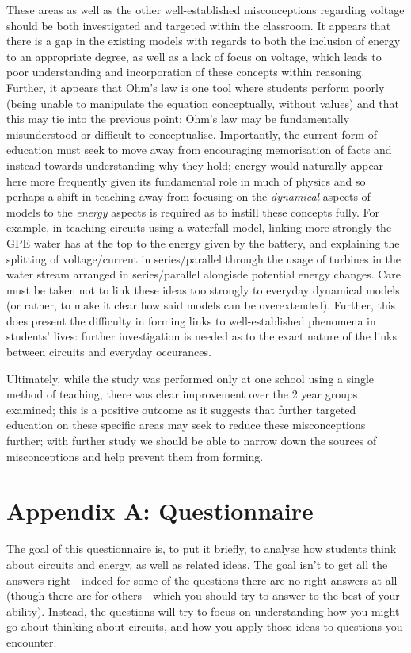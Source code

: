 \documentclass[a4paper,openany,nobib]{tufte-book}
\begin{document}
These areas as well as the other well-established misconceptions regarding voltage should be both investigated and targeted within the classroom. It appears that there is a gap in the existing models with regards to both the inclusion of energy to an appropriate degree, as well as a lack of focus on voltage, which leads to poor understanding and incorporation of these concepts within reasoning. Further, it appears that Ohm's law is one tool where students perform poorly (being unable to manipulate the equation conceptually, without values) and that this may tie into the previous point: Ohm's law may be fundamentally misunderstood or difficult to conceptualise.
Importantly, the current form of education must seek to move away from encouraging memorisation of facts and instead towards understanding why they hold; energy would naturally appear here more frequently given its fundamental role in much of physics and so perhaps a shift in teaching away from focusing on the \emph{dynamical} aspects of models to the \emph{energy} aspects is required as to instill these concepts fully. For example, in teaching circuits using a waterfall model, linking more strongly the GPE water has at the top to the energy given by the battery, and explaining the splitting of voltage/current in series/parallel through the usage of turbines in the water stream arranged in series/parallel alongisde potential energy changes. Care must be taken not to link these ideas too strongly to everyday dynamical models (or rather, to make it clear how said models can be overextended).
Further, this does present the difficulty in forming links to well-established phenomena in students' lives: further investigation is needed as to the exact nature of the links between circuits and everyday occurances.

Ultimately, while the study was performed only at one school using a single method of teaching, there was clear improvement over the 2 year groups examined; this is a positive outcome as it suggests that further targeted education on these specific areas may seek to reduce these misconceptions further; with further study we should be able to narrow down the sources of misconceptions and help prevent them from forming.
\backmatter
\chapter{Appendix A: Questionnaire}
The goal of this questionnaire is, to put it briefly, to analyse how students think about circuits and energy, as well as related ideas. The goal isn't to get all the answers right - indeed for some of the questions there are no right answers at all (though there are for others - which you should try to answer to the best of your ability). Instead, the questions will try to focus on understanding how you might go about thinking about circuits, and how you apply those ideas to questions you encounter.
\end{document}
